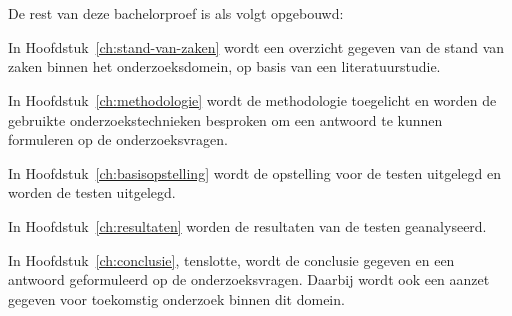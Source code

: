 \section{}%
\label{sec:opzet-bachelorproef}



De rest van deze bachelorproef is als volgt opgebouwd:

In Hoofdstuk~\ref{ch:stand-van-zaken} wordt een overzicht gegeven van de stand van zaken binnen het onderzoeksdomein, op basis van een literatuurstudie.

In Hoofdstuk~\ref{ch:methodologie} wordt de methodologie toegelicht en worden de gebruikte onderzoekstechnieken besproken om een antwoord te kunnen formuleren op de onderzoeksvragen.

In Hoofdstuk~\ref{ch:basisopstelling} wordt de opstelling voor de testen uitgelegd en worden de testen uitgelegd.

In Hoofdstuk~\ref{ch:resultaten} worden de resultaten van de testen geanalyseerd.

In Hoofdstuk~\ref{ch:conclusie}, tenslotte, wordt de conclusie gegeven en een antwoord geformuleerd op de onderzoeksvragen. Daarbij wordt ook een aanzet gegeven voor toekomstig onderzoek binnen dit domein.